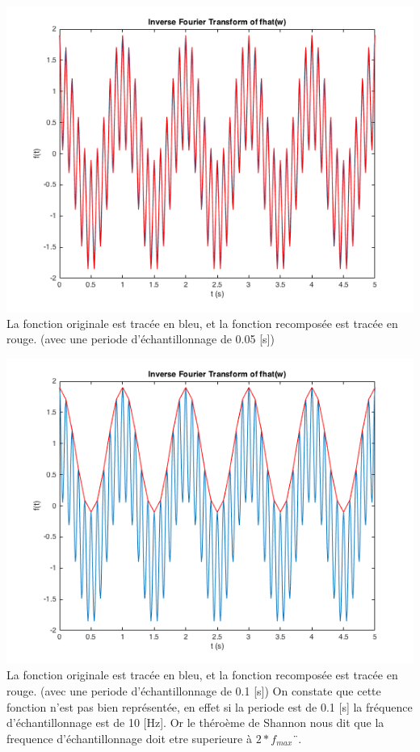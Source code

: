 \documentclass[a4paper,11pt]{article}
\begin{document}
\begin{center}
\includegraphics[scale=0.6]{"f_and_f_ifft1.png"} \newline
La fonction originale est tracée en bleu, et la fonction recomposée est tracée en rouge. (avec une periode d'échantillonnage de 0.05 [s]) 
\end{center} 

\begin{center}
\includegraphics[scale=0.6]{"f_and_f_ifft2.png"} \newline
La fonction originale est tracée en bleu, et la fonction recomposée est tracée en rouge. (avec une periode d'échantillonnage de 0.1 [s])  On constate que cette fonction n'est pas bien représentée, en effet si la periode est de 0.1 [s] la fréquence d'échantillonnage est de 10 [Hz]. Or le théroème de Shannon nous dit que la frequence d'échantillonnage doit etre superieure à $2 * f_{max}¨$.
\end{center} 
\end{document}
